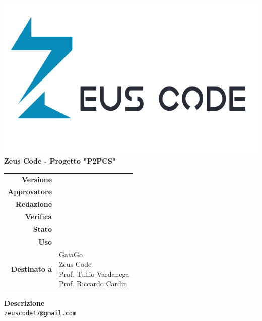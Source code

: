 \thispagestyle{empty}
\begin{titlepage}
	\begin{center}
		\includegraphics[scale = 0.3]{res/images/zeus_code_logo.png}\\
		\large \textbf{Zeus Code - Progetto "P2PCS"} \\
		\vfill
		\Huge \textbf{\doctitle}
		\vspace*{\fill}
		
		\vfill
		\large
		\begin{tabular}{r|l}
			\textbf{Versione} & \rev{} \\
			\textbf{Approvatore} & \approv{} \\
			\textbf{Redazione} & \red{} \\
			\textbf{Verifica} & \ver{} \\
			\textbf{Stato} & \stato{} \\
			\textbf{Uso} & \uso{} \\
			\textbf{Destinato a} & \parbox[t]{5cm}{GaiaGo \\Zeus Code
				\\Prof. Tullio Vardanega\\Prof. Riccardo Cardin}
		\end{tabular}
		\vfill
		\normalsize
		\textbf{Descrizione}\\
		\describedoc
		\vfill
		\small
		\texttt{zeuscode17@gmail.com}
	\end{center}
\end{titlepage}